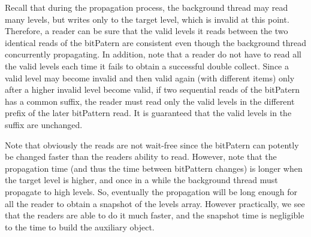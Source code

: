 Recall that during the propagation process, the background
thread may read many levels, but writes only to the target level,
which is invalid at this point.
Therefore, a reader can be sure that the valid levels it reads
between the two identical reads of the bitPatern are consistent
even though the background thread concurrently
propagating.
In addition, note that a reader do not have to read all the valid
levels each time it fails to obtain a successful double collect.
Since a valid level may become invalid and then valid again
(with different items) only after a higher invalid level become
valid, if two sequential reads of the bitPatern has a
common suffix, the reader must read only the valid levels in
the different prefix of the later bitPattern read. 
It is guaranteed that the valid levels in the suffix are
unchanged.

Note that obviously the reads are not wait-free since the
bitPatern can potently be changed faster than the readers ability
to read.
However, note that the propagation time (and thus
the time between bitPattern changes) is longer when the target
level is higher, and once in a while the background thread must
propagate to high levels.
So, eventually the propagation will be long enough for
all the reader to obtain a snapshot of the levels array. 
However practically, we see that the readers are able to do it
much faster, and the snapshot time is negligible to the time to
build the auxiliary object.

